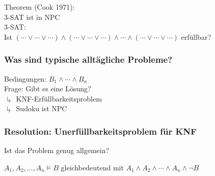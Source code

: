 Theorem (Cook 1971): \\
3-SAT ist in NPC \\
3-SAT: \\
Ist $( \dotsb \vee \dotsb \vee \dotsb ) \wedge ( \dotsb \vee \dotsb \vee \dotsb ) \wedge \dotsb \wedge ( \dotsb \vee \dotsb \vee \dotsb )$ erfüllbar?

\subsubsection{Was sind typische alltägliche Probleme?}
\begin{bsp*}[note = Sudoku]
	Bedingungen: $B_1 \wedge \dotsb \wedge B_n$ \\
	Frage: Gibt es eine Lösung? \\
	$\drsh$ KNF-Erfüllbarkeitsproblem \\
	$\drsh$ Sudoku ist NPC
\end{bsp*}

\subsubsection{Resolution: Unerfüllbarkeitsproblem für KNF}
Ist das Problem genug allgemein? \\
\begin{bsp*}
	$A_1 , A_2 , \dotsc , A_n \models B$ \quad gleichbedeutend mit $A_1 \wedge A_2 \wedge \dotsb \wedge A_n \wedge \neg B$
\end{bsp*}

